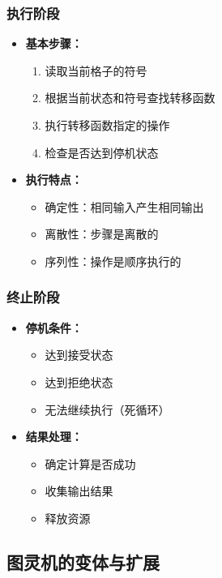 \documentclass[a4paper,12pt]{ctexart}
\begin{document}
\subsubsection{执行阶段}
\begin{itemize}
    \item \textbf{基本步骤：}
        \begin{enumerate}
            \item 读取当前格子的符号
            \item 根据当前状态和符号查找转移函数
            \item 执行转移函数指定的操作
            \item 检查是否达到停机状态
        \end{enumerate}
    \item \textbf{执行特点：}
        \begin{itemize}
            \item 确定性：相同输入产生相同输出
            \item 离散性：步骤是离散的
            \item 序列性：操作是顺序执行的
        \end{itemize}
\end{itemize}

\subsubsection{终止阶段}
\begin{itemize}
    \item \textbf{停机条件：}
        \begin{itemize}
            \item 达到接受状态
            \item 达到拒绝状态
            \item 无法继续执行（死循环）
        \end{itemize}
    \item \textbf{结果处理：}
        \begin{itemize}
            \item 确定计算是否成功
            \item 收集输出结果
            \item 释放资源
        \end{itemize}
\end{itemize}

\subsection{图灵机的变体与扩展}
\end{document}
